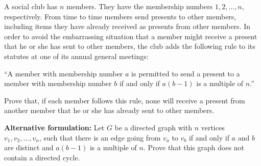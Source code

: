 A social club has $n$ members. They have the membership numbers $1, 2, \ldots, n$, respectively. From time to time members send presents to other members, including items they have already received as presents from other members. In order to avoid the embarrassing situation that a member might receive a present that he or she has sent to other members, the club adds the following rule to its statutes at one of its annual general meetings:

\medskip

``A member with membership number $a$ is permitted to send a present to a member with membership number $b$ if and only if $a(b-1)$ is a multiple of $n$.''

\medskip

Prove that, if each member follows this rule, none will receive a present from another member that he or she has already sent to other members.

\medskip

\textbf{Alternative formulation:} Let $G$ be a directed graph with $n$ vertices $v_1, v_2, \ldots, v_n$, such that there is an edge going from $v_a$ to $v_b$ if and only if $a$ and $b$ are distinct and $a(b-1)$ is a multiple of $n$. Prove that this graph does not contain a directed cycle.
